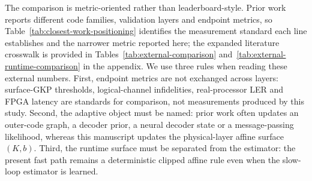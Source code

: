 \documentclass[11pt]{article}
\begin{document}
The comparison is metric-oriented rather than leaderboard-style.  Prior work
reports different code families, validation layers and endpoint metrics, so
Table~\ref{tab:closest-work-positioning} identifies the measurement standard
each line establishes and the narrower metric reported here; the expanded
literature crosswalk is provided in
Tables~\ref{tab:external-comparison} and~\ref{tab:external-runtime-comparison}
in the appendix.  We use three rules when reading these external numbers.
First, endpoint metrics are not exchanged across layers: surface-GKP
thresholds, logical-channel infidelities, real-processor LER and FPGA latency
are standards for comparison, not measurements produced by this study.  Second,
the adaptive object must be named: prior work often updates an outer-code
graph, a decoder prior, a neural decoder state or a message-passing likelihood,
whereas this manuscript updates the physical-layer affine surface \((K,b)\).
Third, the runtime surface must be separated from the estimator: the present
fast path remains a deterministic clipped affine rule even when the slow-loop
estimator is learned.
\end{document}
